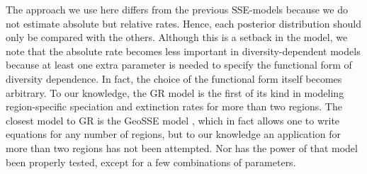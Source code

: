 The approach we use here differs from the previous SSE-models because we do not estimate absolute but relative rates. 
Hence, each posterior distribution should only be compared with the others. 
Although this is a setback in the model, we note that the absolute rate becomes less important in diversity-dependent models because at least one extra parameter is needed to specify the functional form of diversity dependence. 
In fact, the choice of the functional form itself becomes arbitrary. 
To our knowledge, the GR model is the first of its kind in modeling region-specific speciation and extinction rates for more than two regions. 
The closest model to GR is the GeoSSE model \citep{Goldberg2011}, which in fact allows one to write equations for any number of regions, but to our knowledge an application for more than two regions has not been attempted. 
Nor has the power of that model been properly tested, except for a few combinations of parameters. 

